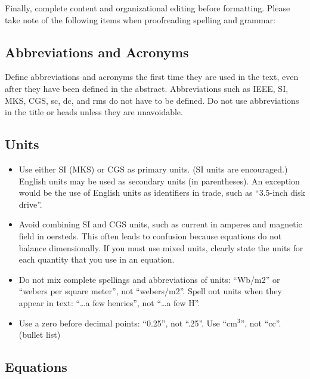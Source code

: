 \documentclass[letterpaper, 10 pt, conference]{ieeeconf}  %
\begin{document}
Finally, complete content and organizational editing before formatting. Please take note of the following items when proofreading spelling and grammar:

\subsection{Abbreviations and Acronyms} Define abbreviations and acronyms the first time they are used in the text, even after they have been defined in the abstract. Abbreviations such as IEEE, SI, MKS, CGS, sc, dc, and rms do not have to be defined. Do not use abbreviations in the title or heads unless they are unavoidable.

\subsection{Units}

\begin{itemize}

  \item Use either SI (MKS) or CGS as primary units. (SI units are encouraged.) English units may be used as secondary units (in parentheses). An exception would be the use of English units as identifiers in trade, such as ``3.5-inch disk drive''.
  \item Avoid combining SI and CGS units, such as current in amperes and magnetic field in oersteds. This often leads to confusion because equations do not balance dimensionally. If you must use mixed units, clearly state the units for each quantity that you use in an equation.
  \item Do not mix complete spellings and abbreviations of units: ``Wb/m2'' or ``webers per square meter'', not ``webers/m2''.  Spell out units when they appear in text: ``\ldots a few henries'', not ``\ldots a few H''.
  \item Use a zero before decimal points: ``0.25'', not ``.25''. Use ``cm$^3$'', not ``cc''. (bullet list)

\end{itemize}


\subsection{Equations}
\end{document}
